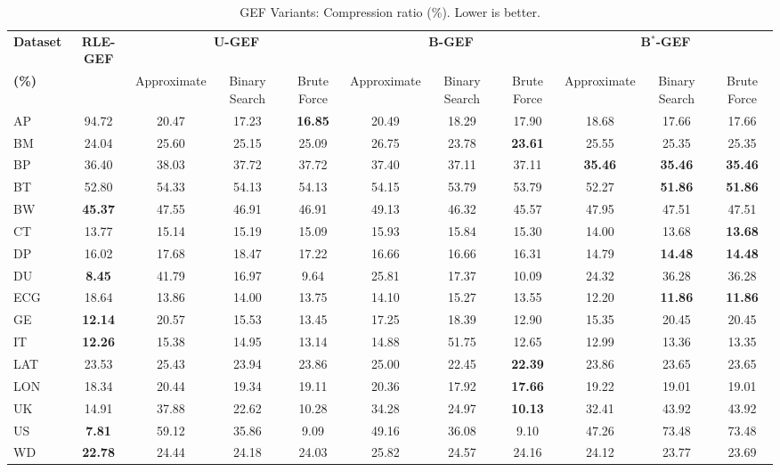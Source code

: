 \begin{table*}[htbp]
\caption{GEF Variants: Compression ratio (\%). Lower is better.}
\label{tab:gef_ratio}
\centering
\small
\setlength{\tabcolsep}{4pt} %
\begin{tabular}{lcccccccccc}
\toprule
\textbf{Dataset} & \textbf{RLE-GEF} & \multicolumn{3}{c}{\textbf{U-GEF}} & \multicolumn{3}{c}{\textbf{B-GEF}} & \multicolumn{3}{c}{\textbf{B$^*$-GEF}} \\
\textbf{(\%)} &   & Approximate & Binary Search & Brute Force & Approximate & Binary Search & Brute Force & Approximate & Binary Search & Brute Force \\
\cmidrule(lr){3-5} \cmidrule(lr){6-8} \cmidrule(lr){9-11} 
\midrule
AP & 94.72 & 20.47 & 17.23 & \textbf{16.85} & 20.49 & 18.29 & 17.90 & 18.68 & 17.66 & 17.66 \\
BM & 24.04 & 25.60 & 25.15 & 25.09 & 26.75 & 23.78 & \textbf{23.61} & 25.55 & 25.35 & 25.35 \\
BP & 36.40 & 38.03 & 37.72 & 37.72 & 37.40 & 37.11 & 37.11 & \textbf{35.46} & \textbf{35.46} & \textbf{35.46} \\
BT & 52.80 & 54.33 & 54.13 & 54.13 & 54.15 & 53.79 & 53.79 & 52.27 & \textbf{51.86} & \textbf{51.86} \\
BW & \textbf{45.37} & 47.55 & 46.91 & 46.91 & 49.13 & 46.32 & 45.57 & 47.95 & 47.51 & 47.51 \\
CT & 13.77 & 15.14 & 15.19 & 15.09 & 15.93 & 15.84 & 15.30 & 14.00 & 13.68 & \textbf{13.68} \\
DP & 16.02 & 17.68 & 18.47 & 17.22 & 16.66 & 16.66 & 16.31 & 14.79 & \textbf{14.48} & \textbf{14.48} \\
DU & \textbf{8.45} & 41.79 & 16.97 & 9.64 & 25.81 & 17.37 & 10.09 & 24.32 & 36.28 & 36.28 \\
ECG & 18.64 & 13.86 & 14.00 & 13.75 & 14.10 & 15.27 & 13.55 & 12.20 & \textbf{11.86} & \textbf{11.86} \\
GE & \textbf{12.14} & 20.57 & 15.53 & 13.45 & 17.25 & 18.39 & 12.90 & 15.35 & 20.45 & 20.45 \\
IT & \textbf{12.26} & 15.38 & 14.95 & 13.14 & 14.88 & 51.75 & 12.65 & 12.99 & 13.36 & 13.35 \\
LAT & 23.53 & 25.43 & 23.94 & 23.86 & 25.00 & 22.45 & \textbf{22.39} & 23.86 & 23.65 & 23.65 \\
LON & 18.34 & 20.44 & 19.34 & 19.11 & 20.36 & 17.92 & \textbf{17.66} & 19.22 & 19.01 & 19.01 \\
UK & 14.91 & 37.88 & 22.62 & 10.28 & 34.28 & 24.97 & \textbf{10.13} & 32.41 & 43.92 & 43.92 \\
US & \textbf{7.81} & 59.12 & 35.86 & 9.09 & 49.16 & 36.08 & 9.10 & 47.26 & 73.48 & 73.48 \\
WD & \textbf{22.78} & 24.44 & 24.18 & 24.03 & 25.82 & 24.57 & 24.16 & 24.12 & 23.77 & 23.69 \\
\bottomrule
\end{tabular}
\end{table*}
